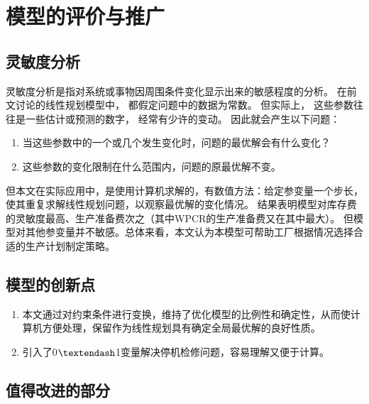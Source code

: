 



\section{模型的评价与推广} %
\label{sec:模型的评价与推广}


\subsection{灵敏度分析} %
\label{sub:灵敏度分析}

灵敏度分析是指对系统或事物因周围条件变化显示出来的敏感程度的分析。 在前文讨论的线性规划模型中， 都假定问题中的数据为常数。
但实际上， 这些参数往往是一些估计或预测的数字， 经常有少许的变动。 因此就会产生以下问题：
\begin{enumerate}
    \item 当这些参数中的一个或几个发生变化时，问题的最优解会有什么变化？
    \item 这些参数的变化限制在什么范围内，问题的原最优解不变。
\end{enumerate}


但本文在实际应用中，是使用计算机求解的，有数值方法：给定参变量一个步长，使其重复求解线性规划问题，以观察最优解的变化情况。
结果表明模型对库存费的灵敏度最高、生产准备费次之（其中WPCR的生产准备费又在其中最大）。
但模型对其他参变量并不敏感。总体来看，本文认为本模型可帮助工厂根据情况选择合适的生产计划制定策略。

\subsection{模型的创新点} %
\label{sub:模型的创新点}

\begin{enumerate}
    \item 本文通过对约束条件进行变换，维持了优化模型的比例性和确定性，从而使计算机方便处理，保留作为线性规划具有确定全局最优解的良好性质。
    \item 引入了0$\textendash$1变量解决停机检修问题，容易理解又便于计算。
\end{enumerate}


\subsection{值得改进的部分} %
\label{sub:值得改进的部分}


